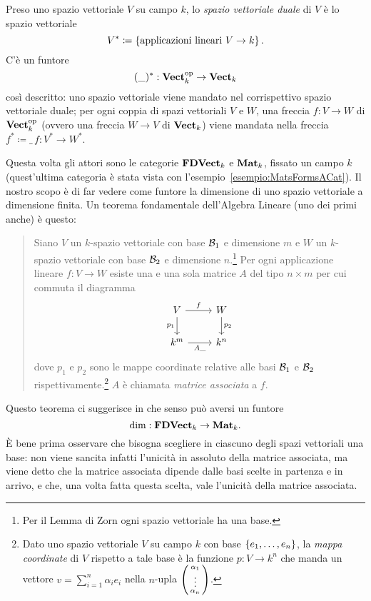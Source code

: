 \begin{esempio}
Preso uno spazio vettoriale \(V\) su campo \(k\), lo {\em spazio vettoriale duale} di \(V\) è lo spazio vettoriale
\[V^\ast \coloneq \left\{\text{applicazioni lineari } V \to k\right\}.\]
C'è un funtore
\[(\_)^\ast : \mathbf{Vect}_k^\text{op} \to \mathbf{Vect}_k\]
così descritto: uno spazio vettoriale viene mandato nel corrispettivo spazio vettoriale duale; per ogni coppia di spazi vettoriali \(V\) e \(W\), una freccia \(f : V \to W\) di \(\mathbf{Vect}_k^\text{op}\) (ovvero una freccia \(W \to V\) di \(\mathbf{Vect}_k\)) viene mandata nella freccia \(f^\ast \coloneq \_\,f : V^\ast \to W^\ast\).
\end{esempio}

\begin{esempio}\label{esempio:DimIsFunctor}
Questa volta gli attori sono le categorie \(\mathbf{FDVect}_k\) e \(\mathbf{Mat}_k\), fissato un campo \(k\) (quest'ultima categoria è stata vista con l'esempio~\ref{esempio:MatsFormsACat}). Il nostro scopo è di far vedere come funtore la dimensione di uno spazio vettoriale a dimensione finita. Un teorema fondamentale dell'Algebra Lineare (uno dei primi anche) è questo:
%
\begin{quotation}
Siano \(V\) un \(k\)-spazio vettoriale con base \(\mathcal B_1\) e dimensione \(m\) e \(W\) un \(k\)-spazio vettoriale con base \(\mathcal B_2\) e dimensione \(n\).\footnote{Per il Lemma di Zorn ogni spazio vettoriale ha una base.} Per ogni applicazione lineare \(f : V \to W\) esiste una e una sola matrice \(A\) del tipo \(n \times m\) per cui commuta il diagramma
\[\begin{tikzcd}
V \ar["f",r] \ar["p_1",d,swap] & W \ar["p_2",d] \\
k^m \ar["A\_",r,swap]          & k^n
\end{tikzcd}\]
dove \(p_1\) e \(p_2\) sono le mappe coordinate relative alle basi \(\mathcal B_1\) e \(\mathcal B_2\) rispettivamente.\footnote{Dato uno spazio vettoriale \(V\) su campo \(k\) con base \(\left\{e_1, \dots, e_n\right\}\), la {\em mappa coordinate} di \(V\) rispetto a tale base è la funzione \(p : V \to k^n\) che manda un vettore \(v = \sum_{i=1}^n \alpha_i e_i\) nella \(n\)-upla \(\left(\begin{smallmatrix}\alpha_1 \\ \vdots \\ \alpha_n\end{smallmatrix}\right)\).} \(A\) è chiamata {\em matrice associata} a \(f\).
\end{quotation}
%
Questo teorema ci suggerisce in che senso può aversi un funtore
\[\dim : \mathbf{FDVect}_k \to \mathbf{Mat}_k.\]
È bene prima osservare che bisogna scegliere in ciascuno degli spazi vettoriali una base: non viene sancita infatti l'unicità in assoluto della matrice associata, ma viene detto che la matrice associata dipende dalle basi scelte in partenza e in arrivo, e che, una volta fatta questa scelta, vale l'unicità della matrice associata.\newline

\end{esempio}
